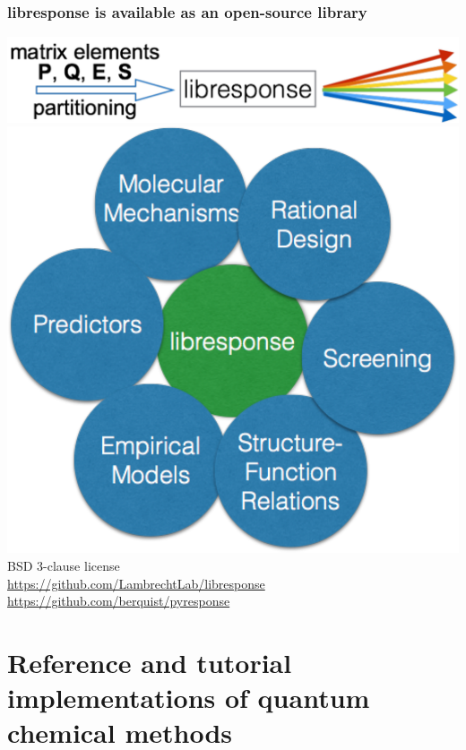 \documentclass[%
    xcolor=usenames,dvipsnames,svgnames%
]{beamer}
\newenvironment{nscenter}
 {\parskip=0pt\par\nopagebreak\centering}
 {\par\noindent\ignorespacesafterend}
\begin{document}
\begin{frame}
  \frametitle{libresponse is available as an open-source library}
  \scriptsize
  \begin{nscenter}
    \includegraphics[scale=0.30]{./figures/libresponse_top.pdf} \\
    \includegraphics[scale=0.32]{./figures/libresponse_bottom.pdf} \\
    BSD 3-clause license \\
    \url{https://github.com/LambrechtLab/libresponse} \\
    \url{https://github.com/berquist/pyresponse}
  \end{nscenter}
\end{frame}

\section{Reference and tutorial implementations of quantum chemical methods}
\end{document}
